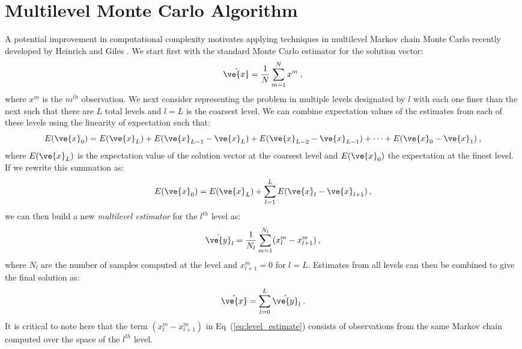 \documentclass[note]{TechNote}
\begin{document}
\section{Multilevel Monte Carlo Algorithm}
\label{sec:algorithm}
A potential improvement in computational complexity motivates applying
techniques in multilevel Markov chain Monte Carlo recently developed
by Heinrich \cite{heinrich_2001} and Giles \cite{giles_2008}. We start
first with the standard Monte Carlo estimator for the solution vector:
\begin{equation}
  \hat{\ve{x}} = \frac{1}{N} \sum_{m=1}^N x^m\:,
  \label{eq:standard_estimator}
\end{equation}
where $x^m$ is the $m^{th}$ observation. We next consider representing
the problem in multiple levels designated by $l$ with each one finer
than the next such that there are $L$ total levels and $l=L$ is the
coarsest level. We can combine expectation values of the estimates
from each of these levels using the linearity of expectation such
that:
\begin{equation}
  E(\ve{x}_{0}) = E(\ve{x}_{L}) + E(\ve{x}_{L-1} - \ve{x}_{L}) +
  E(\ve{x}_{L-2} - \ve{x}_{L-1}) + \dots + E(\ve{x}_{0} -
  \ve{x}_{1})\:,
  \label{eq:linearity_of_expectation}
\end{equation}
where $E(\ve{x}_{L})$ is the expectation value of the solution vector
at the coarsest level and $E(\ve{x}_{0})$ the expectation at the
finest level. If we rewrite this summation as:
\begin{equation}
  E(\ve{x}_{0}) = E(\ve{x}_{L}) + \sum_{l=1}^L E(\ve{x}_{l} -
  \ve{x}_{l+1})\:,
  \label{eq:linearity_of_expectation_sum}
\end{equation}
we can then build a new \textit{multilevel estimator} for the $l^{th}$
level as:
\begin{equation}
    \hat{\ve{y}}_{l} = \frac{1}{N_l} \sum_{m=1}^{N_l} (x^m_{l} -
    x^m_{l+1})\:,
    \label{eq:level_estimate}
\end{equation}
where $N_l$ are the number of samples computed at the level and
$x^m_{l+1} = 0$ for $l=L$. Estimates from all levels can then be
combined to give the final solution as:
\begin{equation}
  \hat{\ve{x}} = \sum_{l=0}^L \hat{\ve{y}}_{l}\:.
  \label{eq:multilevel_estimator}
\end{equation}
It is critical to note here that the term $(x^m_{l} - x^m_{l+1})$
in Eq~(\ref{eq:level_estimate}) consists of observations from the same
Markov chain computed over the space of the $l^{th}$ level. 
\end{document}
